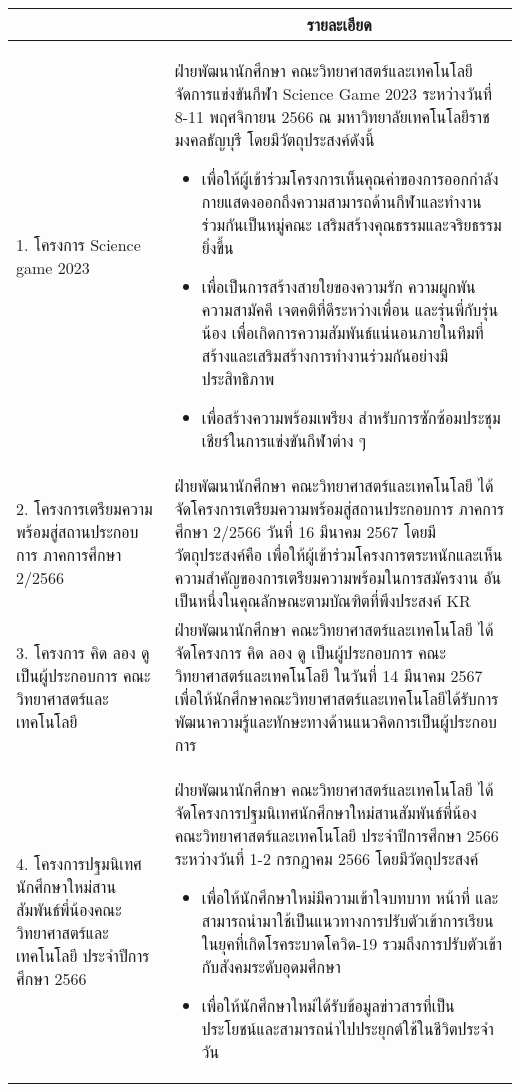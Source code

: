 \begin{longtable}{ |>{\raggedright}p{4.5cm}|p{9cm}|} 
\hline
\centering{\textbf{กิจกรรม}}   & \multicolumn{1}{c|}{\textbf{รายละเอียด}} \\
 \hline
 \endhead
1. โครงการ Science game 2023 & ฝ่ายพัฒนานักศึกษา คณะวิทยาศาสตร์และเทคโนโลยี จัดการแข่งขันกีฬา Science Game 2023 ระหว่างวันที่ 8-11 พฤศจิกายน 2566 ณ มหาวิทยาลัยเทคโนโลยีราชมงคลธัญบุรี โดยมีวัตถุประสงค์ดังนี้
\begin{itemize}
 \item เพื่อให้ผู้เข้าร่วมโครงการเห็นคุณค่าของการออกกำลังกายแสดงออกถึงความสามารถด้านกีฬาและทำงานร่วมกันเป็นหมู่คณะ เสริมสร้างคุณธรรมและจริยธรรมยิ่งขึ้น
\item เพื่อเป็นการสร้างสายใยของความรัก ความผูกพัน ความสามัคคี เจตคติที่ดีระหว่างเพื่อน และรุ่นพี่กับรุ่นน้อง เพื่อเกิดการความสัมพันธ์แน่นอนภายในทีมที่สร้างและเสริมสร้างการทำงานร่วมกันอย่างมีประสิทธิภาพ
\item เพื่อสร้างความพร้อมเพรียง สำหรับการซักซ้อมประชุมเชียร์ในการแข่งขันกีฬาต่าง ๆ 
\end{itemize}
\\ 
\hline
2. โครงการเตรียมความพร้อมสู่สถานประกอบการ ภาคการศึกษา 2/2566 & ฝ่ายพัฒนานักศึกษา คณะวิทยาศาสตร์และเทคโนโลยี ได้จัดโครงการเตรียมความพร้อมสู่สถานประกอบการ ภาคการศึกษา 2/2566 วันที่ 16 มีนาคม 2567 โดยมีวัตถุประสงค์คือ เพื่อให้ผู้เข้าร่วมโครงการตระหนักและเห็นความสำคัญของการเตรียมความพร้อมในการสมัครงาน อันเป็นหนึ่งในคุณลักษณะตามบัณฑิตที่พึงประสงค์ KR
   \\ 
\hline
3. โครงการ คิด ลอง ดู เป็นผู้ประกอบการ คณะวิทยาศาสตร์และเทคโนโลยี &  ฝ่ายพัฒนานักศึกษา คณะวิทยาศาสตร์และเทคโนโลยี ได้จัดโครงการ คิด ลอง ดู เป็นผู้ประกอบการ คณะวิทยาศาสตร์และเทคโนโลยี ในวันที่ 14 มีนาคม 2567 เพื่อให้นักศึกษาคณะวิทยาศาสตร์และเทคโนโลยีได้รับการพัฒนาความรู้และทักษะทางด้านแนวคิดการเป็นผู้ประกอบการ
   \\ 
 \hline
4. โครงการปฐมนิเทศนักศึกษาใหม่สานสัมพันธ์พี่น้องคณะวิทยาศาสตร์และเทคโนโลยี ประจำปีการศึกษา 2566 & ฝ่ายพัฒนานักศึกษา คณะวิทยาศาสตร์และเทคโนโลยี ได้จัดโครงการปฐมนิเทศนักศึกษาใหม่สานสัมพันธ์พี่น้องคณะวิทยาศาสตร์และเทคโนโลยี ประจำปีการศึกษา 2566 ระหว่างวันที่ 1-2 กรกฎาคม 2566  โดยมีวัตถุประสงค์
\begin{itemize}
\item เพื่อให้นักศึกษาใหม่มีความเข้าใจบทบาท หน้าที่ และสามารถนำมาใช้เป็นแนวทางการปรับตัวเข้าการเรียนในยุคที่เกิดโรคระบาดโควิด-19 รวมถึงการปรับตัวเข้ากับสังคมระดับอุดมศึกษา
\item เพื่อให้นักศึกษาใหม่ได้รับข้อมูลข่าวสารที่เป็นประโยชน์และสามารถนำไปประยุกต์ใช้ในชีวิตประจำวัน

\end{itemize}
\end{longtable}
